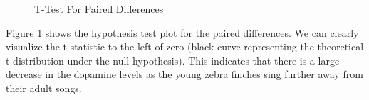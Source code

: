 \documentclass{article}\usepackage[]{graphicx}\usepackage[]{xcolor}
\newenvironment{knitrout}{}{} %
\begin{document}
\begin{enumerate}
\begin{enumerate}
\begin{figure}[H]
\begin{center}
\begin{knitrout}
{}


\end{knitrout}
\caption{T-Test For Paired Differences}
\label{plot4} 
\end{center}
\end{figure}

Figure \ref{plot4} shows the hypothesis test plot for the paired differences. We can clearly visualize the t-statistic to the left of zero (black curve representing the theoretical t-distribution under the null hypothesis). This indicates that there is a large decrease in the dopamine levels as the young zebra finches sing further away from their adult songs.


\end{enumerate}
\end{enumerate}



\end{document}
